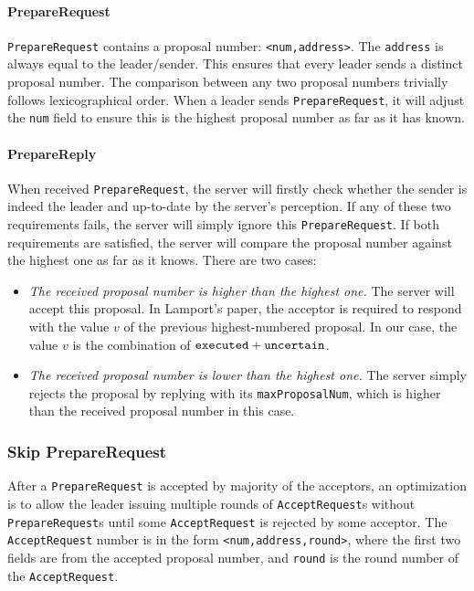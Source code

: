 \documentclass{article}
\numberwithin{equation}{section}
\begin{document}
\paragraph{PrepareRequest}\verb|PrepareRequest| contains a proposal number: \verb|<num,address>|. The \verb|address| is always equal to the leader/sender. This ensures that every leader sends a distinct proposal number. The comparison between any two proposal numbers trivially follows lexicographical order. When a leader sends \verb|PrepareRequest|, it will adjust the \verb|num| field to ensure this is the highest proposal number as far as it has known.

\paragraph{PrepareReply}When received \verb|PrepareRequest|, the server will firstly check whether the sender is indeed the leader and up-to-date by the server's perception. If any of these two requirements fails, the server will simply ignore this \verb|PrepareRequest|. If both requirements are satisfied, the server will compare the proposal number against the highest one as far as it knows. There are two cases:
\begin{itemize}
	\item \textit{The received proposal number is higher than the highest one.} The server will accept this proposal. In Lamport's paper, the acceptor is required to respond with the value $v$ of the previous highest-numbered proposal. In our case, the value $v$ is the combination of $\verb|executed|+\verb|uncertain|$.
	\item \textit{The received proposal number is lower than the highest one.} The server simply rejects the proposal by replying with its \verb|maxProposalNum|, which is higher than the received proposal number in this case. 
\end{itemize}

\subsubsection{Skip PrepareRequest}\label{sec:skip}
After a \verb|PrepareRequest| is accepted by majority of the acceptors, an optimization is to allow the leader issuing multiple rounds of \verb|AcceptRequest|s without \verb|PrepareRequest|s until some \verb|AcceptRequest| is rejected by some acceptor. The \verb|AcceptRequest| number is in the form \verb|<num,address,round>|, where the first two fields are from the accepted proposal number, and \verb|round| is the round number of the \verb|AcceptRequest|.\\
\end{document}
